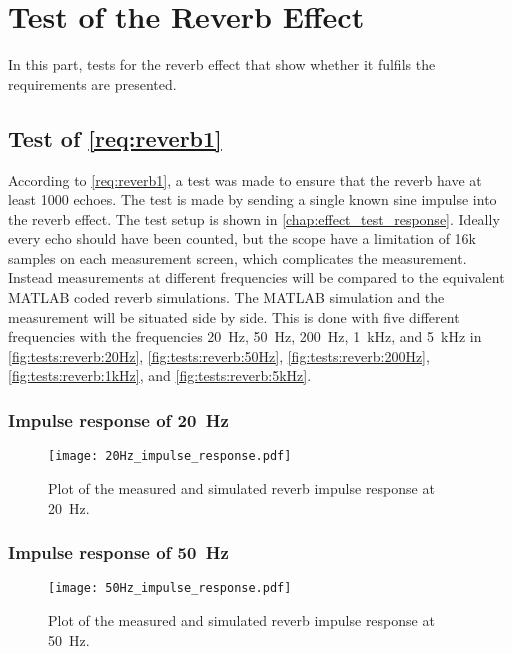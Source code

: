 \newpage
\section{Test of the Reverb Effect}
In this part, tests for the reverb effect that show whether it fulfils the requirements are presented. 


\subsection{Test of \autoref{req:reverb1}}
According to \autoref{req:reverb1}, a test was made to ensure that the \gls{reverb} have at least 1000 echoes. The test is made by sending a single known sine impulse into the \gls{reverb} effect. The test setup is shown in \autoref{chap:effect_test_response}. Ideally every echo should have been counted, but the scope have a limitation of 16k samples on each measurement screen, which complicates the measurement. Instead measurements at different frequencies will be compared to the equivalent MATLAB coded \gls{reverb} simulations. The MATLAB simulation and the measurement will be situated side by side. This is done with five different frequencies with the frequencies \SI{20}{\hertz}, \SI{50}{\hertz}, \SI{200}{\hertz}, \SI{1}{\kilo\hertz}, and \SI{5}{\kilo\hertz} in \autoref{fig:tests:reverb:20Hz}, \autoref{fig:tests:reverb:50Hz}, \autoref{fig:tests:reverb:200Hz}, \autoref{fig:tests:reverb:1kHz}, and \autoref{fig:tests:reverb:5kHz}. 

\subsubsection*{Impulse response of \SI{20}{\hertz}}


\begin{figure}[htbp!]
    \centering
        \texttt{[image: 20Hz\_impulse\_response.pdf]}
        \caption{Plot of the measured and simulated \gls{reverb} impulse response at \SI{20}{\hertz}.}
        \label{fig:tests:reverb:20Hz}
  \end{figure}
  
  \newpage
  
\subsubsection*{Impulse response of \SI{50}{\hertz}}

\begin{figure}[htbp!]
    \centering
        \texttt{[image: 50Hz\_impulse\_response.pdf]}
        \caption{Plot of the measured and simulated \gls{reverb} impulse response at \SI{50}{\hertz}.}
        \label{fig:tests:reverb:50Hz}
  \end{figure}

